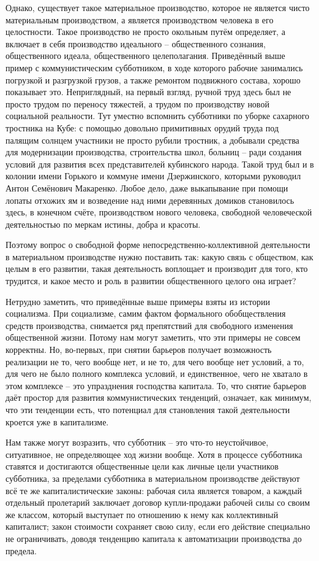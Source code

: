 \documentclass[12pt,a4paper,openany]{book}
\begin{document}
Однако, существует такое материальное производство, которое не является чисто материальным производством, а является производством человека в его целостности. Такое производство не просто окольным путём определяет, а включает в себя производство идеального – общественного сознания, общественного идеала, общественного целеполагания. Приведённый выше пример с коммунистическим субботником, в ходе которого рабочие занимались погрузкой и разгрузкой грузов, а также ремонтом подвижного состава, хорошо показывает это. Неприглядный, на первый взгляд, ручной труд здесь был не просто трудом по переносу тяжестей, а трудом по производству новой социальной реальности. Тут уместно вспомнить субботники по уборке сахарного тростника на Кубе: с помощью довольно примитивных орудий труда под палящим солнцем участники не просто рубили тростник, а добывали средства для модернизации производства, строительства школ, больниц – ради создания условий для развития всех представителей кубинского народа. Такой труд был и в колонии имени Горького и коммуне имени Дзержинского, которыми руководил Антон Семёнович Макаренко. Любое дело, даже выкапывание при помощи лопаты отхожих ям и возведение над ними деревянных домиков становилось здесь, в конечном счёте, производством нового человека, свободной человеческой деятельностью по меркам истины, добра и красоты.

Поэтому вопрос о свободной форме непосредственно-коллективной деятельности в материальном производстве нужно поставить так: какую связь с обществом, как целым в его развитии, такая деятельность воплощает и производит для того, кто трудится, и какое место и роль в развитии общественного целого она играет?

Нетрудно заметить, что приведённые выше примеры взяты из истории социализма. При социализме, самим фактом формального обобществления средств производства, снимается ряд препятствий для свободного изменения общественной жизни. Потому нам могут заметить, что эти примеры не совсем корректны. Но, во-первых, при снятии барьеров получает возможность реализации не то, чего вообще нет, и не то, для чего вообще нет условий, а то, для чего не было полного комплекса условий, и единственное, чего не хватало в этом комплексе – это упразднения господства капитала. То, что снятие барьеров даёт простор для развития коммунистических тенденций, означает, как минимум, что эти тенденции есть, что потенциал для становления такой деятельности кроется уже в капитализме.

Нам также могут возразить, что субботник – это что-то неустойчивое, ситуативное, не определяющее ход жизни вообще. Хотя в процессе субботника ставятся и достигаются общественные цели как личные цели участников субботника, за пределами субботника в материальном производстве действуют всё те же капиталистические законы: рабочая сила является товаром, а каждый отдельный пролетарий заключает договор купли-продажи рабочей силы со своим же классом, который выступает по отношению к нему как коллективный капиталист; закон стоимости сохраняет свою силу, если его действие специально не ограничивать, доводя тенденцию капитала к автоматизации производства до предела.
\end{document}
